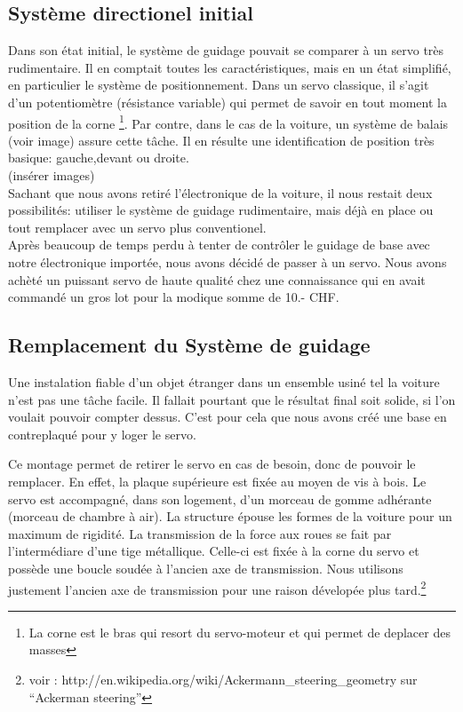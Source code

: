 \documentclass[a4paper,12pt]{report}
\begin{document}
{\subsection{Système directionel initial}
Dans son \'etat initial, le syst\`eme de guidage pouvait se comparer \`a un
servo tr\`es rudimentaire. Il en comptait toutes les caractéristiques, mais en
un état simplifié, en particulier le système de positionnement. Dans un servo
classique, il s'agit d'un potentiomètre (résistance variable) qui permet
de savoir en tout moment la position de la corne \footnote{La corne est le bras qui resort du servo-moteur et qui permet de deplacer des masses}. Par contre, dans le cas de
la voiture, un système de balais (voir image) assure cette tâche. Il en
résulte une identification de position très basique: gauche,devant ou
droite.\\
(ins\'erer images)\\
Sachant que nous avons retir\'e l'\'electronique de la voiture, il nous restait
deux possibilit\'es: utiliser le syst\`eme de guidage rudimentaire, mais
d\'ej\`a en place ou tout remplacer avec un servo plus conventionel.\\
Apr\`es beaucoup de temps perdu \`a tenter de contr\^oler le guidage de base
avec notre \'electronique import\'ee, nous avons d\'ecidé de passer \`a un servo. Nous avons
ach\`eté un puissant servo de haute qualit\'e chez une connaissance qui en
avait command\'e un gros lot pour la modique somme de 10.- CHF.

\subsection{Remplacement du Système de guidage}
Une instalation fiable d'un objet \'etranger dans un ensemble usin\'e tel la
voiture n'est pas une t\^ache facile. Il fallait pourtant que le r\'esultat final
soit solide, si l'on voulait pouvoir compter dessus. C'est pour cela que nous avons
cr\'e\'e une base en contreplaqu\'e pour y loger le servo.

Ce montage permet de retirer le servo en cas de besoin, donc de pouvoir le
remplacer. En effet, la plaque sup\'erieure est fix\'ee au moyen de vis \`a
bois. Le servo est accompagn\'e, dans son logement, d'un morceau de gomme
adh\'erante (morceau de chambre \`a air). La structure \'epouse les formes de
la voiture pour un maximum de rigidit\'e. La transmission de la force aux
roues se fait par l'interm\'ediare d'une tige métallique. Celle-ci est
fix\'ee \`a la corne du servo et possède une boucle soud\'ee \`a l'ancien axe de
transmission. Nous utilisons justement l'ancien axe de transmission pour une
raison d\'evelop\'ee plus tard.\footnote{voir :
http://en.wikipedia.org/wiki/Ackermann\_steering\_geometry sur
``Ackerman steering''}

}
\end{document}
